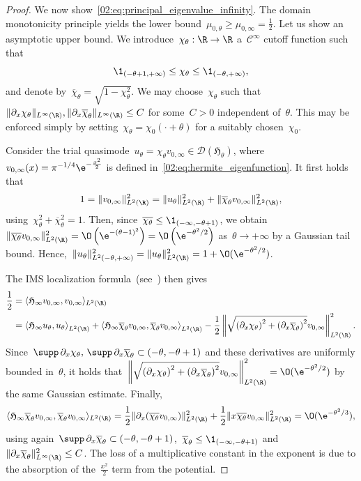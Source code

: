 \begin{proof}
        We now show~\eqref{02:eq:principal_eigenvalue_infinity}. The domain monotonicity principle yields the lower bound~$\mu_{0,\theta}\geq \mu_{0,\infty} = \frac12$.
        Let us show an asymptotic upper bound. We introduce~$\chi_\theta:\R\to\R$ a~$\mathcal C^\infty$ cutoff function such that
        \[\1_{(-\theta+1,+\infty)} \leq \chi_\theta\leq \1_{(-\theta,+\infty)},\]
        and denote by~$\overline{\chi}_\theta = \sqrt{1-\chi_\theta^2}$. We may choose~$\chi_\theta$ such that~$\|\partial_x \chi_\theta\|_{L^\infty(\R)},\|\partial_x\overline{\chi}_\theta\|_{L^\infty(\R)}\leq C$ for some~$C>0$ independent of~$\theta$. This may be enforced simply by setting~$\chi_\theta = \chi_0(\cdot +\theta)$ for a suitably chosen~$\chi_0$.      
        
        Consider the trial quasimode~$u_\theta=\chi_\theta v_{0,\infty}\in \mathcal D(\mathfrak{H}_\theta)$, where~$v_{0,\infty}(x) = \pi^{-1/4}\e^{-\frac{x^2}2}$ is defined in~\eqref{02:eq:hermite_eigenfunction}.
        It first holds that
        \[1 = \|v_{0,\infty}\|^2_{L^2(\R)} = \|u_\theta\|^2_{L^2(\R)} + \|\overline{\chi}_\theta v_{0,\infty}\|^2_{L^2(\R)},\]
        using~$\chi_\theta^2+\overline{\chi}_\theta^2 = 1$. Then, since~$\overline{\chi_\theta}\leq \1_{(-\infty,-\theta+1)}$, we obtain~$\|\overline{\chi_\theta}v_{0,\infty}\|_{L^2(\R)}^2 = \O\left(\e^{-(\theta-1)^2}\right)=\O\left(\e^{-\theta^2/2}\right)$ as~$\theta\to+\infty$ by a Gaussian tail bound. Hence,~$\|u_\theta\|_{L^2(-\theta,+\infty)}^2=\|u_\theta\|^2_{L^2(\R)} = 1 + \O(\e^{-\theta^2/2})$.

        The IMS localization formula~(see~\cite{S83,CFKS87}) then gives
        \[\begin{split}\frac12&=\langle \mathfrak{H}_\infty v_{0,\infty},v_{0,\infty}\rangle_{L^2(\R)}\\
            &= \left\langle \mathfrak{H}_\infty u_\theta,u_\theta \right\rangle_{L^2(\R)} + \left\langle \mathfrak{H}_\infty \overline{\chi}_\theta v_{0,\infty},\overline{\chi}_\theta v_{0,\infty}\right\rangle_{L^2(\R)}-\frac12\left\|\sqrt{\left(\partial_x\chi_\theta\right)^2 + \left(\partial_x\overline\chi_\theta\right)^2} v_{0,\infty}\right\|^2_{L^2(\R)}.
        \end{split}\]
        Since~$\supp\, \partial_x\chi_\theta,\,\supp\, \partial_x \overline{\chi}_\theta \subset (-\theta,-\theta+1)$ and these derivatives are uniformly bounded in~$\theta$, it holds that~$\left\|\sqrt{\left(\partial_x\chi_\theta\right)^2 + \left(\partial_x\overline\chi_\theta\right)^2} v_{0,\infty}\right\|^2_{L^2(\R)} = \O(\e^{-\theta^2/2})$ by the same Gaussian estimate.
        Finally,
        \[\langle \mathfrak{H}_\infty \overline{\chi}_\theta v_{0,\infty},\overline{\chi}_\theta v_{0,\infty}\rangle_{L^2(\R)} = \frac12\|\partial_x(\overline{\chi_\theta}v_{0,\infty})\|^2_{L^2(\R)} + \frac12\|x\overline{\chi_\theta}v_{0,\infty}\|^2_{L^2(\R)}=\O(\e^{-\theta^2/3}),\]
        using again~$\supp\,\partial_x\overline{\chi}_\theta\subset (-\theta,-\theta+1)$,~$\overline{\chi}_\theta\leq \1_{(-\infty,-\theta+1)}$ and~$\|\partial_x\overline{\chi}_\theta\|^2_{L^\infty(\R)}\leq C$. The loss of a multiplicative constant in the exponent is due to the absorption of the~$\frac{x^2}2$ term from the potential.


\end{proof}
